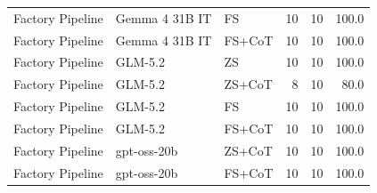 \begin{longtable}{lllrrr}
Factory Pipeline & Gemma 4 31B IT & FS & 10 & 10 & 100.0 \\
Factory Pipeline & Gemma 4 31B IT & FS+CoT & 10 & 10 & 100.0 \\
Factory Pipeline & GLM-5.2 & ZS & 10 & 10 & 100.0 \\
Factory Pipeline & GLM-5.2 & ZS+CoT & 8 & 10 & 80.0 \\
Factory Pipeline & GLM-5.2 & FS & 10 & 10 & 100.0 \\
Factory Pipeline & GLM-5.2 & FS+CoT & 10 & 10 & 100.0 \\
Factory Pipeline & gpt-oss-20b & ZS+CoT & 10 & 10 & 100.0 \\
Factory Pipeline & gpt-oss-20b & FS+CoT & 10 & 10 & 100.0 \\
\end{longtable}
